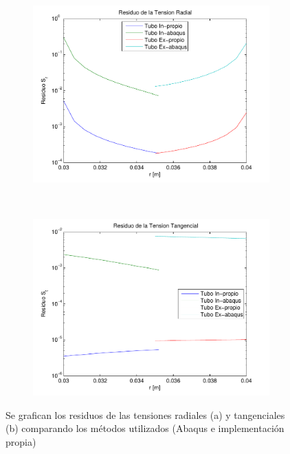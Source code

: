 \begin{figure}[h!]
        \begin{subfigure}[h!]{0.49\textwidth} 
	    \centering
	    \includegraphics[width=\textwidth]{figure1.pdf}
	    \caption {}
	    \end{subfigure}
        ~
        \begin{subfigure}[h!]{0.49\textwidth}
	    \centering
	    \includegraphics[width=\textwidth]{figure2.pdf}
	    \caption {}
	    \end{subfigure}
        \caption{Se grafican los residuos de las tensiones radiales (a) y tangenciales (b) comparando los m\'etodos utilizados (Abaqus e implementaci\'on propia)}
        \label{fig:resS} 
\end{figure}

